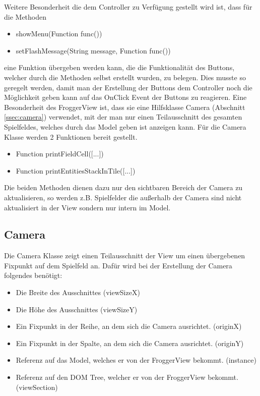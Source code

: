\documentclass[a4paper,10pt]{report}
\begin{document}
{{			\noindent 
			Weitere Besonderheit die dem Controller zu Verfügung gestellt wird ist, dass für die Methoden 
			
			\begin{itemize}
				\item showMenu(Function func())
				\item setFlashMessage(String message, Function func())
			\end{itemize}		
				 			  
			\noindent
			eine Funktion übergeben werden kann, die die Funktionalität des Buttons, welcher durch die Methoden selbst erstellt wurden, zu belegen.
			Dies musste so geregelt werden, damit man der Erstellung der Buttons dem Controller noch die Möglichkeit geben kann auf das OnClick Event
			der Buttons zu reagieren.
			\newline \newline
			Eine Besonderheit des FroggerView ist, dass sie eine Hilfsklasse Camera (Abschnitt \ref{ssec:camera}) verwendet, mit der man nur einen Teilausschnitt des gesamten Spielfeldes,
			welches durch das Model geben ist anzeigen kann. Für die Camera Klasse werden 2 Funktionen bereit gestellt.
			
			\begin{itemize}
				\item Function printFieldCell([...])
				\item Function printEntitiesStackInTile([...])
			\end{itemize}
						
			\noindent
			Die beiden Methoden dienen dazu nur den sichtbaren Bereich der Camera zu aktualisieren, so werden z.B. Spielfelder die außerhalb der Camera sind
			nicht aktualisiert in der View sondern nur intern im Model. 			  
			  
		}		
		\newpage 		 
		\subsection{Camera}
		{
			\label{ssec:camera}
			
			Die Camera Klasse zeigt einen Teilausschnitt der View um einen übergebenen Fixpunkt auf dem Spielfeld an.
			\newline \newline
			\noindent
			Dafür wird bei der Erstellung der Camera folgendes benötigt:
			
			\begin{itemize}
				\item Die Breite des Ausschnittes (viewSizeX)
				\item Die Höhe des Ausschnittes (viewSizeY)
				\item Ein Fixpunkt in der Reihe, an dem sich die Camera ausrichtet. (originX)
				\item Ein Fixpunkt in der Spalte, an dem sich die Camera ausrichtet. (originY)
				\item Referenz auf das Model, welches er von der FroggerView bekommt. (instance)
				\item Referenz auf den DOM Tree, welcher er von der FroggerView bekommt. (viewSection)
			\end{itemize}			 
			
}}
\end{document}
